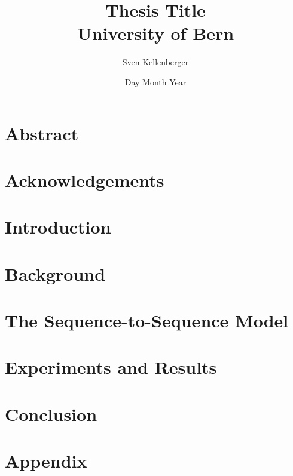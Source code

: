 \documentclass[12pt, twoside]{report}
\begin{document}
\title{
	{Thesis Title}\\
	{\large University of Bern}
}
\author{Sven Kellenberger}
\date{Day Month Year}

\maketitle

\chapter*{Abstract}


\chapter*{Acknowledgements}


\tableofcontents

\chapter{Introduction}


\chapter{Background}


\chapter{The Sequence-to-Sequence Model}


\chapter{Experiments and Results}


\chapter{Conclusion}


\printbibliography

\appendix
\chapter{Appendix}

\end{document}
